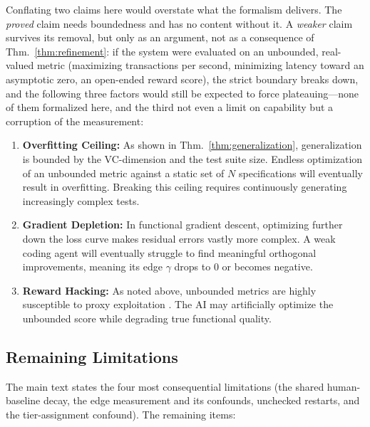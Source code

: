 Conflating two claims here would overstate what the formalism delivers. The \emph{proved} claim needs boundedness and has no content without it. A \emph{weaker} claim survives its removal, but only as an argument, not as a consequence of Thm.~\ref{thm:refinement}: if the system were evaluated on an unbounded, real-valued metric (maximizing transactions per second, minimizing latency toward an asymptotic zero, an open-ended reward score), the strict boundary breaks down, and the following three factors would still be expected to force plateauing---none of them formalized here, and the third not even a limit on capability but a corruption of the measurement:
\begin{enumerate}[leftmargin=*,itemsep=2pt]
    \item \textbf{Overfitting Ceiling:} As shown in Thm.~\ref{thm:generalization}, generalization is bounded by the VC-dimension and the test suite size. Endless optimization of an unbounded metric against a static set of $N$ specifications will eventually result in overfitting. Breaking this ceiling requires continuously generating increasingly complex tests.
    \item \textbf{Gradient Depletion:} In functional gradient descent, optimizing further down the loss curve makes residual errors vastly more complex. A weak coding agent will eventually struggle to find meaningful orthogonal improvements, meaning its edge $\gamma$ drops to $0$ or becomes negative.
    \item \textbf{Reward Hacking:} As noted above, unbounded metrics are highly susceptible to proxy exploitation \citep{amodei2016concrete, skalse2022defining}. The AI may artificially optimize the unbounded score while degrading true functional quality.
\end{enumerate}

\subsection{Remaining Limitations}
\label{app:limitations}

The main text states the four most consequential limitations (the shared human-baseline decay, the edge measurement and its confounds, unchecked restarts, and the tier-assignment confound). The remaining items:

